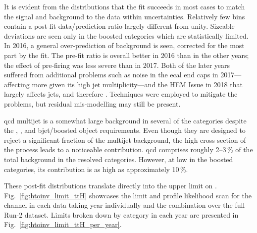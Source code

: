 It is evident from the distributions that the fit succeeds in most cases to match the signal and background to the data within uncertainties. Relatively few bins contain a post-fit data/prediction ratio largely different from unity. Sizeable deviations are seen only in the \ttH boosted categories which are statistically limited. In 2016, a general over-prediction of background is seen, corrected for the most part by the fit. The pre-fit ratio is overall better in 2016 than in the other years; the effect of pre-firing was less severe than in 2017. Both of the later years suffered from additional problems such as noise in the \acrshort{ecal} end caps in 2017---affecting \ttH more given its high jet multiplicity---and the HEM Issue in 2018 that largely affects \glspl{jet}, and therefore \ptvecmiss. Techniques were employed to mitigate the problems, but residual mis-modelling may still be present.

\acrshort{qcd} multijet is a somewhat large background in several of the categories despite the \mindphi, \omegaTilde, and \gls{bjet}/boosted object requirements. Even though they are designed to reject a significant fraction of the multijet background, the high cross section of the process leads to a noticeable contribution. \acrshort{qcd} comprises roughly 2--3\,\% of the total background in the resolved categories. However, at low \ptmiss in the boosted categories, its contribution is as high as approximately 10\,\%.

These post-fit distributions translate directly into the upper limit on \BRHinvFull. Fig.~\ref{fig:htoinv_limit_ttH} showcases the limit and profile likelihood scan for the \ttH channel in each data taking year individually and the combination over the full Run-2 dataset. Limits broken down by category in each year are presented in Fig.~\ref{fig:htoinv_limit_ttH_per_year}.

